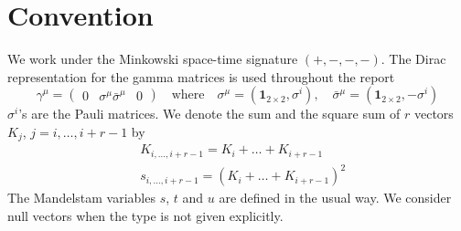 \section*{Convention}
We work under the Minkowski space-time signature $(+,-,-,-)$.
The Dirac representation for the gamma matrices is used throughout the report
\begin{equation}
\gamma^\mu = \begin{pmatrix}
0 & \sigma^\mu 
\bar{\sigma}^\mu & 0
\end{pmatrix}
\quad\mathrm{where}\quad
\sigma^\mu = (\mathbf{1}_{2\times 2}, \sigma^i)
,\quad
\bar{\sigma}^\mu = (\mathbf{1}_{2\times 2}, -\sigma^i)
\end{equation}
$\sigma^i$'s are the Pauli matrices.
We denote the sum and the square sum of $r$ vectors $K_j$, $j=i,\ldots, i+r-1$ by
\begin{equation}
\begin{split}
& K_{i,\ldots,i+r-1} = K_i +\ldots + K_{i+r-1}
\\
& s_{i,\ldots , i+r-1} = (K_i+\ldots + K_{i+r-1})^2
\end{split}
\end{equation}
The Mandelstam variables $s$, $t$ and $u$ are defined in the usual way.
We consider null vectors when the type is not given explicitly.









